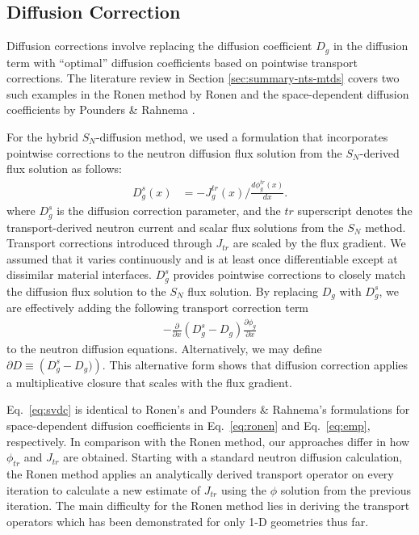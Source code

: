 \subsection{Diffusion Correction} \label{sec:diffusion-correction}

Diffusion corrections involve replacing the diffusion coefficient $D_g$ in the
diffusion term with ``optimal'' diffusion coefficients based on
pointwise transport corrections. The literature review in Section \ref{sec:summary-nts-mtds} covers
two such
examples in the Ronen method by Ronen \cite{ronen_accurate_2004} and the space-dependent diffusion
coefficients by Pounders \& Rahnema \cite{pounders_diffusion_2009}.

For the hybrid $S_N$-diffusion method, we used a formulation that incorporates pointwise
corrections to the neutron diffusion flux solution from the $S_N$-derived flux solution as follows:
%
\begin{align}
  D^s_g(x) &= -J^{tr}_g(x)\bigg/\frac{d\phi^{tr}_g(x)}{dx}. \label{eq:svdc}
\end{align}
%
where $D^s_g$ is the diffusion correction parameter, and the $tr$ superscript denotes the
transport-derived neutron
current and scalar flux solutions from the $S_N$ method. Transport corrections introduced through
$J_{tr}$ are scaled by the flux gradient. We assumed that it varies continuously and is
at least once differentiable except at dissimilar material interfaces. $D^s_g$ provides
pointwise corrections to closely match the diffusion flux solution to the $S_N$ flux solution.
By replacing $D_g$ with $D^s_g$, we are effectively adding the following transport correction term
%
\begin{gather}
  -\frac{\partial}{\partial x}(D^s_g-D_g)\frac{\partial\phi_g}{\partial x}
\end{gather}
to the neutron diffusion equations. Alternatively, we may define
$\partial D\equiv\left(D^s_g-D_g)\right)$. This alternative form shows that diffusion
correction applies a multiplicative closure that scales with the flux gradient.

Eq.\ \ref{eq:svdc} is identical to Ronen's \cite{ronen_accurate_2004} and Pounders \& Rahnema's
\cite{pounders_diffusion_2009} formulations for space-dependent diffusion coefficients in Eq.\
\ref{eq:ronen} and Eq.\ \ref{eq:emp}, respectively. In comparison with
the Ronen method, our approaches differ in how $\phi_{tr}$ and $J_{tr}$ are obtained. Starting with
a standard neutron diffusion calculation, the Ronen method applies an analytically derived
transport operator on every iteration to calculate a new estimate of $J_{tr}$ using the $\phi$
solution from the previous iteration. The main difficulty for the Ronen method lies in deriving the
transport operators which has been demonstrated for only 1-D geometries thus far.

